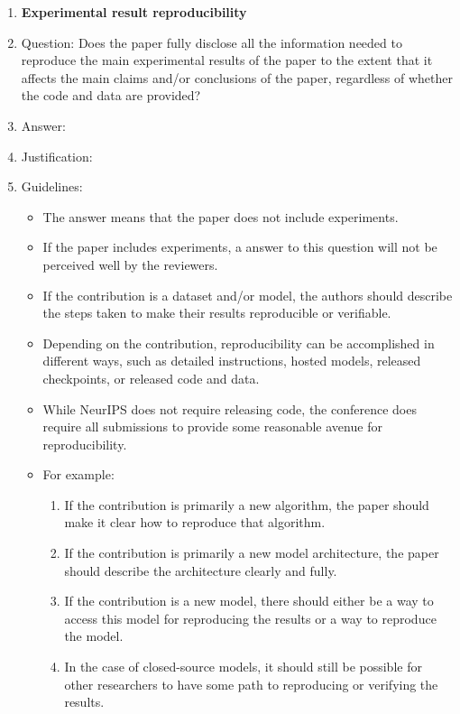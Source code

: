 \begin{enumerate}
\item {\bf Experimental result reproducibility}
    \item[] Question: Does the paper fully disclose all the information needed to reproduce the main experimental results of the paper to the extent that it affects the main claims and/or conclusions of the paper, regardless of whether the code and data are provided?
    \item[] Answer: \answerTODO{}
    \item[] Justification: \justificationTODO{}
    \item[] Guidelines:
    \begin{itemize}
        \item The answer \answerNA{} means that the paper does not include experiments.
        \item If the paper includes experiments, a \answerNo{} answer to this question will not be perceived well by the reviewers.
        \item If the contribution is a dataset and/or model, the authors should describe the steps taken to make their results reproducible or verifiable.
        \item Depending on the contribution, reproducibility can be accomplished in different ways, such as detailed instructions, hosted models, released checkpoints, or released code and data.
        \item While NeurIPS does not require releasing code, the conference does require all submissions to provide some reasonable avenue for reproducibility.
        \item For example:
        \begin{enumerate}
            \item If the contribution is primarily a new algorithm, the paper should make it clear how to reproduce that algorithm.
            \item If the contribution is primarily a new model architecture, the paper should describe the architecture clearly and fully.
            \item If the contribution is a new model, there should either be a way to access this model for reproducing the results or a way to reproduce the model.
            \item In the case of closed-source models, it should still be possible for other researchers to have some path to reproducing or verifying the results.
        \end{enumerate}
    \end{itemize}


\end{enumerate}
